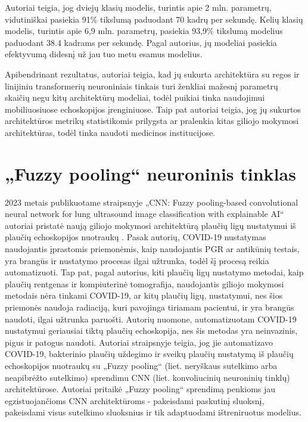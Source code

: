 \documentclass[fleqn]{VUMIFKompMagistrinis}
\begin{document}
Autoriai teigia, jog dviejų klasių modelis, turintis apie 2 mln. parametrų, vidutiniškai pasiekia 91\% tikslumą paduodant 70 kadrų per sekundę. Kelių klasių modelis, turintis apie 6,9 mln. parametrų, pasiekia 93,9\%  tikslumą modelius paduodant 38.4 kadrams per sekundę. Pagal autorius, jų modeliai pasiekia efektyvumą didesnį už jau tuo metu esamus modelius. 
\par
Apibendrinant rezultatus, autoriai teigia, kad jų sukurta architektūra su regos ir linijiniu transformerių neuroniniais tinkais turi ženkliai mažesnį parametrų skaičių negu kitų architektūrų modeliai, todėl puikiai tinka naudojimui mobiliuosiuose echoskopijos įrenginiuose. Taip pat autoriai teigia, jog jų sukurtos architektūros metrikų statistikomis prilygsta ar pralenkia kitas giliojo mokymosi architektūras, todėl tinka naudoti medicinos institucijose.\cite{PAY21} 

\section{„Fuzzy pooling“ neuroninis tinklas}
2023 metais publikuotame straipsnyje „CNN: Fuzzy pooling-based convolutional neural network for lung ultrasound image classification with explainable AI“ autoriai pristatė naują giliojo mokymosi architektūrą plaučių ligų nustatymui iš plaučių echoskopijos nuotraukų \cite{HASAN2023}. Pasak autorių, COVID-19 nustatymas naudojantis įprastomis priemonėmis, kaip naudojantis PGR ar antikūnių testais, yra brangūs ir nustatymo procesas ilgai užtrunka, todėl šį procesą reikia automatizuoti. Tap pat, pagal autorius, kiti plaučių ligų nustatymo metodai, kaip plaučių rentgenas ir kompiuterinė tomografija, naudojantis giliojo mokymosi metodais nėra tinkami COVID-19, ar kitų plaučių ligų, nustatymui, nes šios priemonės naudoja radiaciją, kuri pavojinga tiriamam pacientui, ir yra brangūs naudoti, ilgai užtrunka paruošti. Autorių nuomone, automatizuotam COVID-19 nustatymui geriausiai tiktų plaučių echoskopija, nes šis metodas yra neinvazinis, pigus ir patogus naudoti. Autoriai straipsnyje teigia, jog jie automatizavo COVID-19, bakterinio plaučių uždegimo ir sveikų plaučių nustatymą iš plaučių echoskopijos nuotraukų su  „Fuzzy pooling“ (liet. neryškaus sutelkimo arba neapibrėžto sutelkimo) sprendimu CNN (liet. konvoliucinių neuroninių tinklų) architektūrose. Autoriai pritaikė „Fuzzy pooling“ sprendimą penkioms jau egzistuojančioms CNN architektūroms - pakeisdami paskutinį sluoksnį, pakeisdami visus sutelkimo sluoksnius ir tik adaptuodami ištreniruotus modelius. \cite{HASAN2023}
\end{document}

